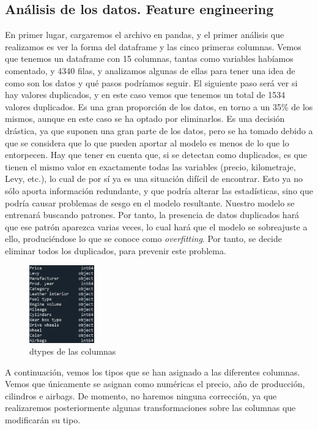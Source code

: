 \documentclass[a4paper,onecolumn]{extarticle}
\begin{document}
\begin{sloppypar}
\subsection{Análisis de los datos. Feature engineering}
En primer lugar, cargaremos el archivo en pandas, y el primer análisis que realizamos es ver la forma del dataframe y las cinco primeras columnas. Vemos que 
tenemos un dataframe con 15 columnas, tantas como variables habíamos comentado, y 4340 filas, y analizamos algunas de ellas para tener una idea de como son 
los datos y qué pasos podríamos seguir. El siguiente paso será ver si hay valores duplicados, y en este caso vemos que tenemos un total de 1534 valores duplicados.
Es una gran proporción de los datos, en torno a un 35\% de los mismos, aunque en este caso se ha optado por eliminarlos. Es una decisión drástica, ya que suponen 
una gran parte de los datos, pero se ha tomado debido a que se considera que lo que pueden aportar al modelo es menos de lo que lo entorpecen. Hay que tener en 
cuenta que, si se detectan como duplicados, es que tienen el mismo valor en exactamente todas las variables (precio, kilometraje, Levy, etc.), lo cual de por sí
ya es una situación difícil de encontrar. Esto ya no sólo aporta información redundante, y que podría alterar las estadísticas, sino que podría causar problemas 
de sesgo en el modelo resultante. Nuestro modelo se entrenará buscando patrones. Por tanto, la presencia de datos duplicados hará que ese patrón aparezca varias 
veces, lo cual hará que el modelo se sobreajuste a ello, produciéndose lo que se conoce como \textit{overfitting}. Por tanto, se decide eliminar todos los 
duplicados, para prevenir este problema.

\begin{figure}
    \includegraphics[width=0.25\textwidth]{imgs/dtypes.png}
    \caption{dtypes de las columnas} \label{fig:dtypes}
\end{figure}
A continuación, vemos los tipos que se han asignado a las diferentes columnas. Vemos que únicamente se asignan como numéricas el precio, año de producción, cilindros 
e airbags. De momento, no haremos ninguna corrección, ya que realizaremos posteriormente algunas transformaciones sobre las columnas que modificarán su tipo. 


\end{sloppypar}
\end{document}
